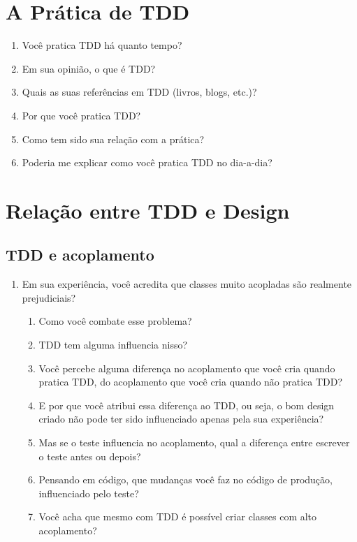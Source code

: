 \section{A Prática de TDD}
\label{entrevista:pratica}

\begin{enumerate}
	\item Você pratica TDD há quanto tempo?

	\item Em sua opinião, o que é TDD?
	
	\item Quais as suas referências em TDD (livros, blogs, etc.)?

	\item Por que você pratica TDD?

	\item Como tem sido sua relação com a prática?

	\item Poderia me explicar como você pratica TDD no dia-a-dia?

\end{enumerate}

\section{Relação entre TDD e Design}

\subsection{TDD e acoplamento}
\label{entrevista:acoplamento}

\begin{enumerate}
	\item{Em sua experiência, você acredita que classes muito acopladas são realmente prejudiciais?}
		\begin{enumerate}
			\item Como você combate esse problema?

			\item TDD tem alguma influencia nisso?
			
			\item Você percebe alguma diferença no acoplamento que você cria quando
			pratica TDD, do acoplamento que você cria quando não pratica TDD?
			
			\item E por que você atribui essa diferença ao TDD, ou seja, o bom design
			criado não pode ter sido influenciado apenas pela sua experiência?
			
			\item Mas se o teste influencia no acoplamento, 
			qual a diferença entre escrever o teste antes ou depois?

			\item Pensando em código, que mudanças você faz no código de produção, influenciado
			pelo teste?
			
			\item Você acha que mesmo com TDD é possível criar classes com alto acoplamento? 
		\end{enumerate}
\end{enumerate}

